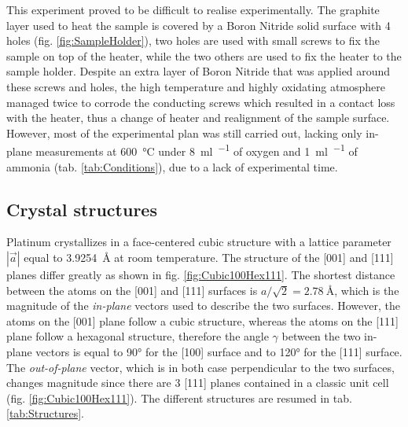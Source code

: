 This experiment proved to be difficult to realise experimentally.
The graphite layer used to heat the sample is covered by a Boron Nitride solid surface with 4 holes (fig. \ref{fig:SampleHolder}), two holes are used with small screws to fix the sample on top of the heater, while the two others are used to fix the heater to the sample holder.
Despite an extra layer of Boron Nitride that was applied around these screws and holes, the high temperature and highly oxidating atmosphere managed twice to corrode the conducting screws which resulted in a contact loss with the heater, thus a change of heater and realignment of the sample surface.
However, most of the experimental plan was still carried out, lacking only in-plane measurements at \qty{600}{\degreeCelsius} under \qty{8}{\ml\per\min} of oxygen and \qty{1}{\ml\per\min} of ammonia (tab. \ref{tab:Conditions}), due to a lack of experimental time.


\subsection{Crystal structures}

Platinum crystallizes in a face-centered cubic structure with a lattice parameter $|\vec{a}|$ equal to \qty{3.9254}{\angstrom} at room temperature.
The structure of the [001] and [111] planes differ greatly as shown in fig. \ref{fig:Cubic100Hex111}.
The shortest distance between the atoms on the [001] and [111] surfaces is $a/\sqrt{2} = \qty{2.78}{\angstrom}$, which is the magnitude of the \textit{in-plane} vectors used to describe the two surfaces.
However, the atoms on the [001] plane follow a cubic structure, whereas the atoms on the [111] plane follow a hexagonal structure, therefore the angle $\gamma$ between the two in-plane vectors is equal to \ang{90} for the [100] surface and to \ang{120} for the [111] surface.
The \textit{out-of-plane} vector, which is in both case perpendicular to the two surfaces, changes magnitude since there are 3 [111] planes contained in a classic unit cell (fig. \ref{fig:Cubic100Hex111}).
The different structures are resumed in tab. \ref{tab:Structures}.

